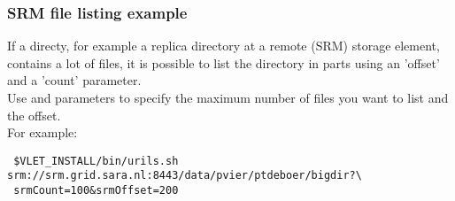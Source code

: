 \subsubsection{SRM file listing example}
     
If a directy, for example a replica directory at a remote (SRM) storage element,
contains a lot of files, it is possible to list the directory in parts using an
'offset' and a 'count' parameter. \\
Use   and  parameters to specify the maximum
number of files you want to list and the offset. \\
For example:  

\hspace*{10mm}\begin{minipage}{170mm}
\begin{verbatim} $VLET_INSTALL/bin/urils.sh srm://srm.grid.sara.nl:8443/data/pvier/ptdeboer/bigdir?\
 srmCount=100&srmOffset=200
\end{verbatim}
\end{minipage}



